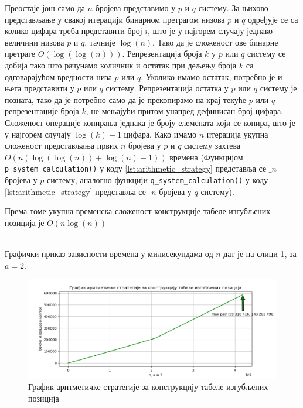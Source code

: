 \documentclass[a4paper]{article}
\begin{document}
Преостаје још само да $ n $ бројева представимо у $ p $ и $ q $ систему. За њихово представљање у свакој итерацији бинарном претрагом низова $ p $ и $ q $ одређује се са колико цифара треба представити број $ i $, што је у најгорем случају једнако величини низова $ p $ и $ q $, тачније $ \log(n) $. Тако да је сложеност ове бинарне претраге $ O(\log(\log(n))) $. Репрезентација броја $ k $ у $ p $ или $ q $ систему се добија тако што рачунамо количник и остатак при дељењу броја $ k $ са одговарајућом вредности низа $ p $ или $ q $. Уколико имамо остатак, потребно је и њега представити у $ p $ или $ q $ систему. Репрезентација остатка у $ p $ или $ q $ систему је позната, тако да је потребно само да је прекопирамо на крај текуће $ p $ или $ q $ репрезентације броја $ k $, не мењајући притом унапред дефинисан број цифара. Сложеност операције копирања једнака је броју елемената који се копира, што је у најгорем случају $ \log(k) - 1 $ цифара. Како имамо $ n $ итерација укупна сложеност представљања првих $ n $ бројева у $ p $ и $ q $ систему захтева $ O(n(\log(\log(n)) + \log(n) - 1)) $ времена (Функцијом \verb|p_system_calculation()| у коду \ref{lst:arithmetic_strategy} представља се $ \_n $ бројева у $ p $ систему, аналогно функцији \verb|q_system_calculation()| у коду \ref{lst:arithmetic_strategy} представља се $ \_n $ бројева у $ q $ систему).

Према томе укупна временска сложеност конструкције табеле изгубљених позиција је $ O(n\log(n)) $



\leavevmode\\
Графички приказ зависности времена у милисекундама од $ n $ дат је на слици \ref{fig:arithmetic}, за $ a = 2 $.

\begin{figure}[H]
	\begin{center}
		\includegraphics[width=\textwidth]{arithmetic.png}
	\end{center}
	\caption{График аритметичке стратегије за конструкцију табеле изгубљених позиција}
	\label{fig:arithmetic}
\end{figure}
\end{document}
